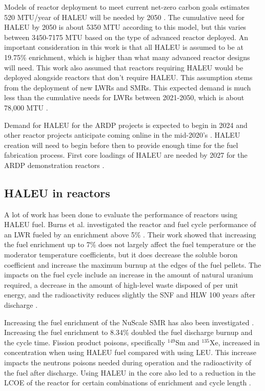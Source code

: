 Models of reactor deployment to meet current net-zero carbon goals 
estimates 520 MTU/year of \gls{HALEU} 
will be needed by 2050 
\cite{dixon_estimated_2022}. The cumulative need for \gls{HALEU} by 2050 
is about 5350 MTU according to this model, but this varies between 
3450-7175 MTU based on the type of advanced reactor deployed. An important 
consideration in this work is that all \gls{HALEU} is assumed to be 
at 19.75\% enrichment, which is higher than what many advanced reactor 
designs will need. This work also assumed that reactors 
requiring \gls{HALEU} would be deployed alongside reactors that don't 
require \gls{HALEU}. This assumption stems from the deployment of new 
\glspl{LWR} and \glspl{SMR}. This expected demand is 
much less than the cumulative needs for \glspl{LWR} between 2021-2050, which 
is about 78,000 MTU \cite{dixon_estimated_2022}. 

Demand for \gls{HALEU} for the \gls{ARDP} projects is expected to begin in 
2024 and other reactor projects anticipate coming online in the 
mid-2020's \cite{nuclear_energy_institute_establishing_2022}. 
\gls{HALEU} creation will 
need to begin before then to provide enough time for the 
fuel fabrication process. First core loadings of \gls{HALEU} are needed by 
2027 for the \gls{ARDP} demonstration reactors \cite{dixon_estimated_2022}. 

\subsection{HALEU in reactors}
A lot of work has been done to evaluate the performance of reactors 
using \gls{HALEU} fuel. Burns et al. investigated the reactor and fuel cycle 
performance of an \gls{LWR} fueled by an enrichment above 5\% \cite{burns_reactor_2020}.
Their work showed that increasing the fuel enrichment up to 7\% does not 
largely affect the fuel temperature or the moderator temperature coefficients,
but it does decrease the soluble boron coefficient and increase the maximum 
burnup at the edges of the fuel pellets. The impacts on the fuel cycle include 
an increase in the amount of natural uranium required, a decrease in the 
amount of high-level waste disposed of per unit energy, and the 
radioactivity reduces slightly the \gls{SNF} and \gls{HLW} 100 years after 
discharge \cite{burns_reactor_2020}.

Increasing the fuel enrichment of the NuScale \gls{SMR} has also been 
investigated \cite{carlson_implications_2022}. Increasing the fuel 
enrichment to 8.34\% doubled the fuel discharge burnup and the cycle time. 
Fission product poisons, specifically $^{149}$Sm and $^{135}$Xe, increased 
in concentration when using \gls{HALEU} fuel compared with using \gls{LEU}. 
This increase impacts the 
neutrons poisons needed during operation and the radioactivity of 
the fuel after discharge. Using \gls{HALEU} in the core also led to a 
reduction in the \gls{LCOE} of the reactor for certain combinations of 
enrichment and cycle length \cite{carlson_economic_2020,carlson_implications_2022}.

